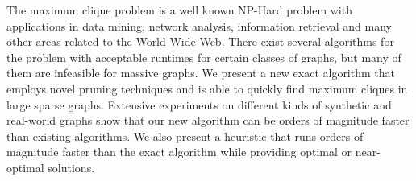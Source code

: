 The maximum clique problem is a well known NP-Hard problem with
applications in data mining, network analysis, information retrieval and many other
areas related to the World Wide Web.
There exist several algorithms for the problem with acceptable runtimes for
certain classes of graphs, but many of them are infeasible for massive graphs. 
We present a new exact algorithm that employs novel pruning techniques and 
is able to quickly find maximum cliques in large sparse graphs. 
Extensive experiments on different kinds of synthetic and 
real-world graphs show that our new algorithm can be orders of magnitude 
faster than existing algorithms.
We also present a heuristic that runs orders of magnitude faster than 
the exact algorithm while providing optimal or near-optimal solutions.

